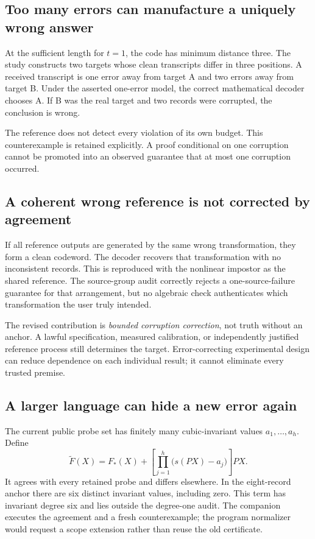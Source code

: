 \documentclass[11pt,letterpaper]{article}
\theoremstyle{remark}\newtheorem{remark}{Remark}[section]
\begin{document}
\subsection{Too many errors can manufacture a uniquely wrong answer}
At the sufficient length for $t=1$, the code has minimum distance three. The study constructs two targets whose clean transcripts differ in three positions. A received transcript is one error away from target A and two errors away from target B. Under the asserted one-error model, the correct mathematical decoder chooses A. If B was the real target and two records were corrupted, the conclusion is wrong.

The reference does not detect every violation of its own budget. This counterexample is retained explicitly. A proof conditional on one corruption cannot be promoted into an observed guarantee that at most one corruption occurred.

\subsection{A coherent wrong reference is not corrected by agreement}
If all reference outputs are generated by the same wrong transformation, they form a clean codeword. The decoder recovers that transformation with no inconsistent records. This is reproduced with the nonlinear impostor as the shared reference. The source-group audit correctly rejects a one-source-failure guarantee for that arrangement, but no algebraic check authenticates which transformation the user truly intended.

The revised contribution is \emph{bounded corruption correction}, not truth without an anchor. A lawful specification, measured calibration, or independently justified reference process still determines the target. Error-correcting experimental design can reduce dependence on each individual result; it cannot eliminate every trusted premise.

\subsection{A larger language can hide a new error again}
The current public probe set has finitely many cubic-invariant values $a_1,\ldots,a_h$. Define
\begin{equation}
 \widetilde F(X)=F_*(X)+\left[\prod_{j=1}^{h}\bigl(s(PX)-a_j\bigr)\right]PX.
\end{equation}
It agrees with every retained probe and differs elsewhere. In the eight-record anchor there are six distinct invariant values, including zero. This term has invariant degree six and lies outside the degree-one audit. The companion executes the agreement and a fresh counterexample; the program normalizer would request a scope extension rather than reuse the old certificate.
\end{document}
